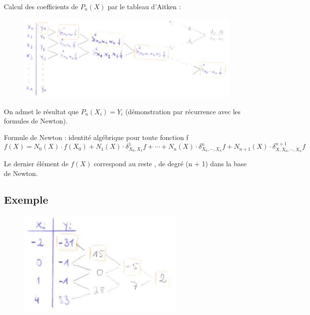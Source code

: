 \bigbreak
Calcul des coefficients de $P_n(X)$ par le tableau d'Aitken :
\begin{figure}[h]
    \centering
    \includegraphics[scale=0.9]{2-interp-aitken.png}
\end{figure}

On admet le résultat que $P_n(X_i) = Y_i$ (démonstration par récurrence avec les formules de Newton).


Formule de Newton : identité algébrique pour toute fonction f
\begin{equation}
    f(X) = N_0(X) \cdot f(X_0) + N_1(X) \cdot \delta_{X_0,X_1}^1 f + \cdots + N_n(X) \cdot \delta_{X_0,\cdots,X_n}^n f + N_{n + 1}(X) \cdot \delta_{X,X_0,\cdots,X_n}^{n + 1} f
\end{equation}

Le dernier élément de $f(X)$ correspond au \og reste \fg, de degré (n + 1) dans la base de Newton.


\subsection* {Exemple}

\begin{figure}[h]
    \centering
    \includegraphics[scale=1.0]{2-interp-exemple.png}
\end{figure}

